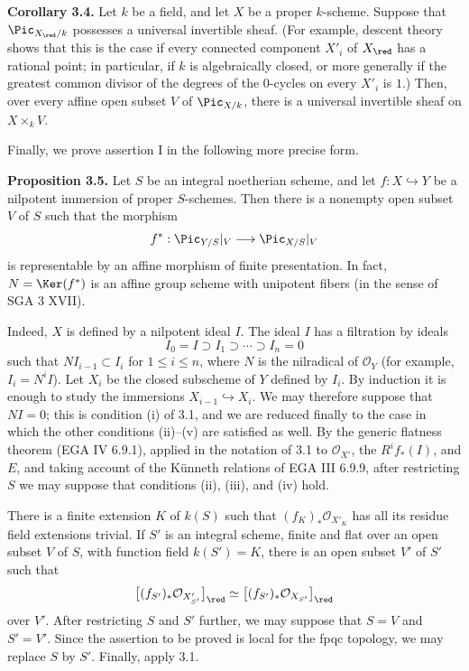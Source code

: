 \textbf{Corollary 3.4.} Let $k$ be a field, and let $X$ be a proper
$k$-scheme. Suppose that $\Pic_{X_{\red}/k}$ possesses a universal
invertible sheaf. (For example, descent theory shows that this is the case
if every connected component $X'_i$ of $X_{\red}$ has a rational point; in
particular, if $k$ is algebraically closed, or more generally if the greatest
common divisor of the degrees of the $0$-cycles on every $X'_i$ is $1$.)
Then, over every affine open subset $V$ of $\Pic_{X/k}$, there is a universal
invertible sheaf on $X\times_kV$.

Finally, we prove assertion I in the following more precise form.

\textbf{Proposition 3.5.} Let $S$ be an integral noetherian scheme, and let
$f:X\hookrightarrow Y$ be a nilpotent immersion of proper $S$-schemes.
Then there is a nonempty open subset $V$ of $S$ such that the morphism
\[
  f^*:\Pic_{Y/S}|_V\longrightarrow\Pic_{X/S}|_V
\]
is representable by an affine morphism of finite presentation. In fact,
$N=\Ker(f^*)$ is an affine group scheme with unipotent fibers (in the sense
of SGA 3 XVII).

Indeed, $X$ is defined by a nilpotent ideal $I$. The ideal $I$ has a
filtration by ideals
\[
  I_0=I\supset I_1\supset\cdots\supset I_n=0
\]
such that $NI_{i-1}\subset I_i$ for $1\leq i\leq n$, where $N$ is the
nilradical of $\mathcal O_Y$ (for example, $I_i=N^iI$). Let $X_i$ be the
closed subscheme of $Y$ defined by $I_i$. By induction it is enough to study
the immersions $X_{i-1}\hookrightarrow X_i$. We may therefore suppose that
$NI=0$; this is condition (i) of 3.1, and we are reduced finally to the case
in which the other conditions (ii)--(v) are satisfied as well. By the generic
flatness theorem (EGA IV 6.9.1), applied in the notation of 3.1 to
$\mathcal O_{X'}$, the $R^if_*(I)$, and $E$, and taking account of the
K\"unneth relations of EGA III 6.9.9, after restricting $S$ we may suppose
that conditions (ii), (iii), and (iv) hold.

There is a finite extension $K$ of $k(S)$ such that
$(f_K)_*\mathcal O_{X'_K}$ has all its residue field extensions trivial.
If $S'$ is an integral scheme, finite and flat over an open subset $V$ of
$S$, with function field $k(S')=K$, there is an open subset $V'$ of $S'$
such that
\[
  \bigl[(f_{S'})_*\mathcal O_{X'_{S'}}\bigr]_{\red}
  \simeq
  \bigl[(f_{S'})_*\mathcal O_{X_{S'}}\bigr]_{\red}
\]
over $V'$. After restricting $S$ and $S'$ further, we may suppose that
$S=V$ and $S'=V'$. Since the assertion to be proved is local for the fpqc
topology, we may replace $S$ by $S'$. Finally, apply 3.1.


